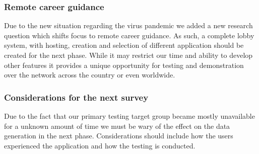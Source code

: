 \subsubsection{Remote career guidance}
Due to the new situation regarding the virus pandemic we added a new research question which shifts focus to remote career guidance. As such, a complete lobby system, with hosting, creation and selection of different application should be created for the next phase. While it may restrict our time and ability to develop other features it provides a unique opportunity for testing and demonstration over the network across the country or even worldwide.   













\subsubsection{Considerations for the next survey}
Due to the fact that our primary testing target group became mostly unavailable for a unknown amount of time we must be wary of the effect on the data generation in the next phase.  Considerations should include how the users experienced the application and how the testing is conducted.

\cleardoublepage